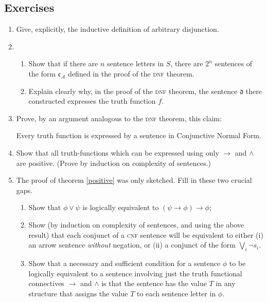 {\small

\subsection*{Exercises} \label{ex5}

\begin{enumerate}
\item Give, explicitly, the inductive definition of arbitrary disjunction.
\item \begin{enumerate}
	
	\item Show that if there are $n$ sentence letters in $S$, there are $2^{n}$ sentences of the form $\mathfrak{c}_{\mathscr{A}}$ defined in the proof of the \textsc{\lowercase{DNF}} theorem.
\item Explain clearly why, in the proof of the \textsc{\lowercase{DNF}} theorem, the sentence $\mathfrak{d}$ there constructed expresses the truth function $f$.
\end{enumerate}
\item  Prove, by an argument analogous to the \textsc{\lowercase{DNF}} theorem, this claim: \begin{theorem} 	Every truth function is expressed by a sentence in Conjunctive Normal Form.\end{theorem}
\item Show that  all truth-functions which can be expressed using only $\to$ and $\wedge$ are positive. (Prove by induction on complexity of sentences.)

\item The proof of theorem \ref{positive} was only sketched. Fill in these two crucial gaps.\begin{enumerate} 
	\item Show that $\phi\vee \psi$ is logically equivalent to $(\psi \to \phi)\to \phi$;
	\item Show (by induction on complexity of sentences, and using the above result) that each conjunct of a \textsc{\lowercase{CNF}} sentence will be equivalent to either (i) an arrow sentence \emph{without} negation, or (ii)  a conjunct  of the form $\bigvee_{i} \neg s_{i}$.
		\item	 Show that a necessary and sufficient condition for a sentence $\phi$ to be logically equivalent to a sentence involving just the truth functional connectives $\to$ and $\wedge$ is that the sentence has the value $T$ in any structure that assigns the value $T$ to each sentence letter in $\phi$. \end{enumerate}


\end{enumerate}}
